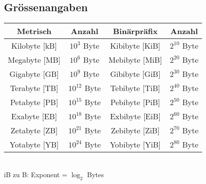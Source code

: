 \subsection{Grössenangaben}
\begin{tabular}{c|c|c|c|}
	\textbf{Metrisch} & \textbf{Anzahl} & \textbf{Binärpräfix} & \textbf{Anzahl}\\
	\hline
	Kilobyte [kB] & $10^{3}$ Byte & Kibibyte [KiB] & $2^{10}$ Byte \\
	Megabyte [MB] & $10^{6}$ Byte & Mebibyte [MiB] & $2^{20}$ Byte \\\hline
	Gigabyte [GB] & $10^{9}$ Byte & Gibibyte [GiB] & $2^{30}$ Byte \\
	Terabyte [TB] & $10^{12}$ Byte & Tebibyte [TiB] & $2^{40}$ Byte \\\hline
	Petabyte [PB] & $10^{15}$ Byte & Pebibyte [PiB] & $2^{50}$ Byte \\
	Exabyte [EB] & $10^{18}$ Byte & Exbibyte [EiB] & $2^{60}$ Byte \\\hline
	Zetabyte [ZB] & $10^{21}$ Byte & Zebibyte [ZiB] & $2^{70}$ Byte \\
	Yotabyte [YB] & $10^{24}$ Byte & Yobibyte [YiB] & $2^{80}$ Byte \\
\end{tabular}\\
iB zu B: Exponent = $\log_{2}$ Bytes